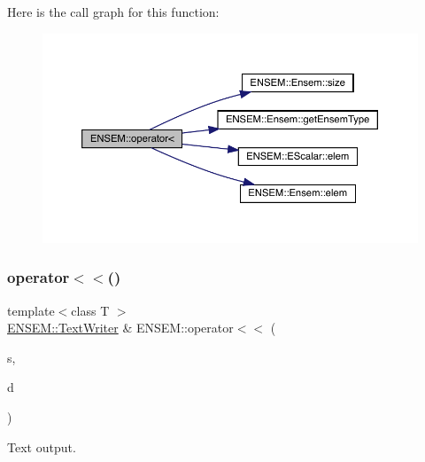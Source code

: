 Here is the call graph for this function\+:\nopagebreak
\begin{figure}[H]
\begin{center}
\leavevmode
\includegraphics[width=350pt]{d1/d9e/group__eensem_ga32b783bbc9759bd7ae2cbaa1f757f87d_cgraph}
\end{center}
\end{figure}
\mbox{\label{group__eensem_ga6ec953adfd003a66dd85074b0e1ad399}} 
\subsubsection{\texorpdfstring{operator$<$$<$()}{operator<<()}\hspace{0.1cm}{\footnotesize\ttfamily [1/4]}}
{\footnotesize\ttfamily template$<$class T $>$ \\
\mbox{\hyperlink{classENSEM_1_1TextWriter}{E\+N\+S\+E\+M\+::\+Text\+Writer}} \& E\+N\+S\+E\+M\+::operator$<$$<$ (\begin{DoxyParamCaption}\item[{\mbox{\hyperlink{classENSEM_1_1TextWriter}{E\+N\+S\+E\+M\+::\+Text\+Writer}} \&}]{s,  }\item[{const \mbox{\hyperlink{classENSEM_1_1Ensem}{Ensem}}$<$ T $>$ \&}]{d }\end{DoxyParamCaption})\hspace{0.3cm}{\ttfamily [inline]}}



Text output. 

